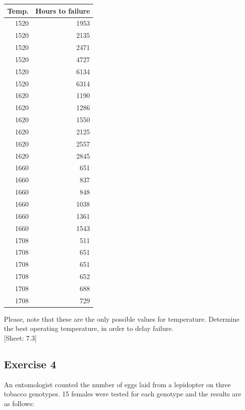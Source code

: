 \documentclass[a4paper,12pt,oneside]{book}
\begin{document}
\begin{longtable}[]{@{}rr@{}}
\toprule
Temp. & Hours to failure \\
\midrule
\endhead
1520 & 1953 \\
1520 & 2135 \\
1520 & 2471 \\
1520 & 4727 \\
1520 & 6134 \\
1520 & 6314 \\
1620 & 1190 \\
1620 & 1286 \\
1620 & 1550 \\
1620 & 2125 \\
1620 & 2557 \\
1620 & 2845 \\
1660 & 651 \\
1660 & 837 \\
1660 & 848 \\
1660 & 1038 \\
1660 & 1361 \\
1660 & 1543 \\
1708 & 511 \\
1708 & 651 \\
1708 & 651 \\
1708 & 652 \\
1708 & 688 \\
1708 & 729 \\
\bottomrule
\end{longtable}

Please, note that these are the only possible values for temperature. Determine the best operating temperature, in order to delay failure.\\
{[}Sheet: 7.3{]}

\hypertarget{exercise-4-3}{%
\subsection{Exercise 4}\label{exercise-4-3}}

An entomologist counted the number of eggs laid from a lepidopter on three tobacco genotypes. 15 females were tested for each genotype and the results are as follows:
\end{document}
